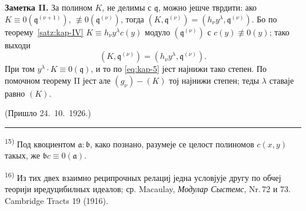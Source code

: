 \documentclass[11pt]{article}
\newcommand{\foreign}[1]{#1}
\theoremstyle{plain}
\begin{document}
\textbf{Заметка II.} За полином $K$, не делимы с $\mathfrak{q}$,
можно јешче тврдити: ако
$K \equiv 0(\mathfrak{q}^{(\nu+1)})$,
$\not\equiv 0(\mathfrak{q}^{(\nu)})$, тогда
$(K, \mathfrak{q}^{(\nu)}) = (h_{\nu}y^{\lambda}, \mathfrak{q}^{(\nu)})$.
Бо по теорему~\ref{satz:kap-IV}
$K \equiv h_{\nu}y^{\lambda}c(y)$ модуло
$(\mathfrak{q}^{(\nu)})$ с $c(y) \not\equiv 0(y)$; тако выходи
\[
(K, \mathfrak{q}^{(\nu)}) = (h_{\nu}y^{\lambda}, \mathfrak{q}^{(\nu)}).
\]
При том $y^{\lambda} \cdot K \equiv 0(\mathfrak{q})$, и то по
\eqref{eq:kap-5} јест најнижи тако степен. По помочном теорему II
јест але $(g_{\nu}) - (K)$ тој најнижи степен; теды $\lambda$ ставаје
равно $(K)$.

\vfill
\begin{flushright}
(Пришло 24.\ 10.\ 1926.)
\end{flushright}

\vspace{0.5em}
\noindent\rule{\textwidth}{0.4pt}
\vspace{0.3em}

{\footnotesize
\textsuperscript{15)} Под квоциентом $\mathfrak{a}:\mathfrak{b}$, како познано,
разумеје се целост полиномов $c(x,y)$ такых, же
$\mathfrak{b}c \equiv 0(\mathfrak{a})$.

\textsuperscript{16)} Из тих двех взаимно реципрочных релациј једна условјује
другу по обчеј теорији иредуцибилных идеалов; ср. Macaulay,
\textit{Модулар Сыстемс}, Nr.\,72 и 73. \foreign{Cambridge Tracts} 19 (1916).
}
\end{document}
